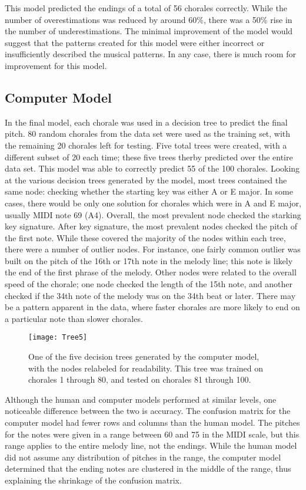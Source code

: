 \documentclass[12pt]{article}
\begin{document}
This model predicted the endings of a total of 56 chorales correctly. While the number of overestimations was reduced by around 60\%, there was a 50\% rise in the number of underestimations. The minimal improvement of the model would suggest that the patterns created for this model were either incorrect or insufficiently described the musical patterns. In any case, there is much room for improvement for this model.

\subsection{Computer Model}
In the final model, each chorale was used in a decision tree to predict the final pitch. 80 random chorales from the data set were used as the training set, with the remaining 20 chorales left for testing. Five total trees were created, with a different subset of 20 each time; these five trees therby predicted over the entire data set. This model was able to correctly predict 55 of the 100 chorales. Looking at the various decision trees generated by the model, most trees contained the same node: checking whether the starting key was either A or E major. In some cases, there would be only one solution for chorales which were in A and E major, usually MIDI note 69 (A4). Overall, the most prevalent node checked the starking key signature. After key signature, the most prevalent nodes checked the pitch of the first note. While these covered the majority of the nodes within each tree, there were a number of outlier nodes. For instance, one fairly common outlier was built on the pitch of the 16th or 17th note in the melody line; this note is likely the end of the first phrase of the melody. Other nodes were related to the overall speed of the chorale; one node checked the length of the 15th note, and another checked if the 34th note of the melody was on the 34th beat or later. There may be a pattern apparent in the data, where faster chorales are more likely to end on a particular note than slower chorales.\\
\begin{figure}[h]
  \texttt{[image: Tree5]}
  \centering
  \caption{One of the five decision trees generated by the computer model, with the nodes relabeled for readability. This tree was trained on chorales 1 through 80, and tested on chorales 81 through 100.}
\end{figure}

Although the human and computer models performed at similar levels, one noticeable difference between the two is accuracy. The confusion matrix for the computer model had fewer rows and columns than the human model. The pitches for the notes were given in a range between 60 and 75 in the MIDI scale, but this range applies to the entire melody line, not the endings. While the human model did not assume any distribution of pitches in the range, the computer model determined that the ending notes are clustered in the middle of the range, thus explaining the shrinkage of the confusion matrix.
\end{document}
